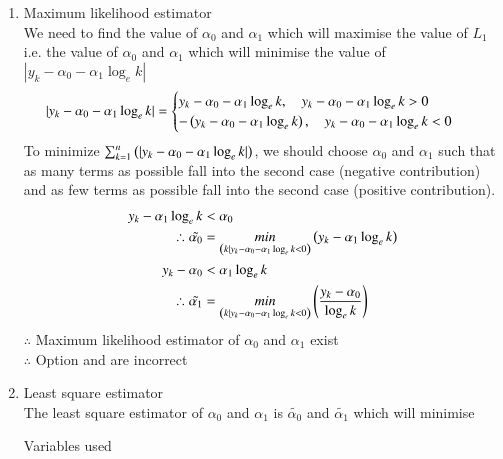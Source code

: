 \documentclass[journal,12pt,onecolumn]{IEEEtran}
\theoremstyle{remark}
\begin{document}
\begin{enumerate}
	\item Maximum likelihood estimator\\
	We need to find the value of $\alpha_{0}$ and $\alpha_{1}$ which will maximise the value of $L_{1}$ i.e. the value of 
	$\alpha_{0}$ and $\alpha_{1}$ which will minimise the value of $|y_{k}-\alpha_{0}-\alpha_{1} \log_{e}k|$
	\begin{align}
		|y_{k}-\alpha_{0}-\alpha_{1} \log_{e}k| &=
		\begin{cases}
		y_{k}-\alpha_{0}-\alpha_{1} \log_{e}k ,\quad y_{k}-\alpha_{0}-\alpha_{1} \log_{e}k > 0
			\\
		-\left(y_{k}-\alpha_{0}-\alpha_{1} \log_{e}k\right) ,\quad y_{k}-\alpha_{0}-\alpha_{1} \log_{e}k < 0
		\end{cases}
	\end{align}
	To minimize $\sum_{k = 1}^{n} \left(|y_{k}-\alpha_{0}-\alpha_{1} \log_{e}k|\right)$, 
	we should choose $\alpha_{0}$ and $\alpha_{1}$ such that as many terms as possible fall into the second case
	(negative contribution) and as few terms as possible fall into the second case (positive contribution).
	\begin{align}
		y_{k} -\alpha_{1} \log_{e}k &< \alpha_{0} \\%
		\therefore \tilde{\alpha_{0}} &= \underset{\brak{k|y_{k} - \alpha_{0}-\alpha_{1}\log_{e}k < 0}}{min} \brak{y_{k} - \alpha_{1}\log_{e}k}\\
		y_{k} - \alpha_{0} &< \alpha_{1} \log_{e}k \\%
		\therefore \tilde{\alpha_{1}} &= \underset{\brak{k|y_{k} -\alpha_{0} -\alpha_{1}\log_{e}k < 0}}{min} \brak{\frac{y_{k} - \alpha_{0}}{\log_{e}k}}\\
	\end{align}
$\therefore$ Maximum likelihood estimator of $\alpha_{0}$ and $\alpha_{1}$ exist\\
$\therefore$ Option  and  are incorrect\\
\item Least square estimator\\
The least square estimator of $\alpha_{0}$ and $\alpha_{1}$ is $\tilde{\alpha_{0}}$ and $\tilde{\alpha_{1}}$ which will minimise
\begin{table}[!htb]
	
	\caption{Variables used}

\end{table}
\end{enumerate}
\end{document}

